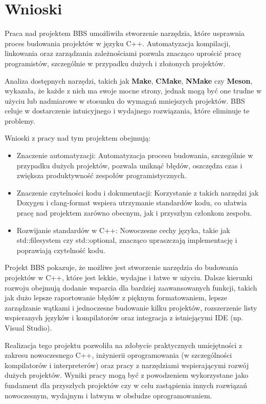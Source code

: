 \chapter{Wnioski}
Praca nad projektem BBS umożliwiła stworzenie narzędzia, które usprawnia proces budowania projektów w języku C++. Automatyzacja kompilacji, linkowania oraz zarządzania zależnościami pozwala znacząco uprościć pracę programistów, szczególnie w przypadku dużych i złożonych projektów.

Analiza dostępnych narzędzi, takich jak \textbf{Make}, \textbf{CMake}, \textbf{NMake} czy \textbf{Meson}, wykazała, że każde z nich ma swoje mocne strony, jednak mogą być one trudne w użyciu lub nadmiarowe w stosunku do wymagań mniejszych projektów. BBS celuje w dostarczenie intuicyjnego i wydajnego rozwiązania, które eliminuje te problemy.

Wnioski z pracy nad tym projektem obejmują:
\begin{itemize}
    \item Znaczenie automatyzacji: Automatyzacja procesu budowania, szczególnie w przypadku dużych projektów, pozwala uniknąć błędów, oszczędza czas i zwiększa produktywność zespołów programistycznych.
    \item Znaczenie czytelności kodu i dokumentacji: Korzystanie z takich narzędzi jak Doxygen i clang-format wspiera utrzymanie standardów kodu, co ułatwia pracę nad projektem zarówno obecnym, jak i przyszłym członkom zespołu.
    \item Rozwijanie standardów w C++: Nowoczesne cechy języka, takie jak std::filesystem czy std::optional, znacząco upraszczają implementację i poprawiają czytelność kodu.
\end{itemize}

Projekt BBS pokazuje, że możliwe jest stworzenie narzędzia do budowania projektów w C++, które jest lekkie, wydajne i łatwe w użyciu. Dalsze kierunki rozwoju obejmują dodanie wsparcia dla bardziej zaawansowanych funkcji, takich jak dużo lepsze raportowanie błędów z pięknym formatowaniem, lepsze zarządzanie wątkami i jednoczesne budowanie kilku projektów, rozszerzenie listy wspieranych języków i kompilatorów oraz integracja z istniejącymi IDE (np. Visual Studio).

Realizacja tego projektu pozwoliła na zdobycie praktycznych umiejętności z zakresu nowoczesnego C++, inżynierii oprogramowania (w szczególności kompilatorów i interpreterów) oraz pracy z narzędziami wspierającymi rozwój dużych projektów. Wyniki pracy mogą być z powodzeniem wykorzystane jako fundament dla przyszłych projektów czy w celu zastąpienia innych rozwiązań nowoczesnym, wydajnym i łatwym w obsłudze oprogramowaniem.